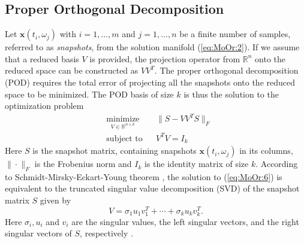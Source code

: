\documentclass[final]{siamart}
\begin{document}
\subsection{Proper Orthogonal Decomposition} \label{chap:MoOr.PrOr:1}
Let $\mathbf x (t_i,\omega_j)$ with $i=1,\dots,m$ and $j=1,\dots,n$ be a finite number of samples, referred to as \emph{snapshots}, from the solution manifold (\ref{eq:MoOr:2}). If we {{\color{black}} assume} that a reduced basis $V$ is provided, the projection operator from $\mathbb R^n$ onto the reduced space can be constructed as $VV^T$. The proper orthogonal decomposition (POD) requires the total error of projecting all the snapshots onto the reduced space to be {{\color{black}} minimized}. The POD basis of size $k$ is thus the solution to the optimization problem
\begin{equation} \label{eq:MoOr:6}
\begin{aligned}
& \underset{V\in \mathbb R^{n\times k}}{\text{minimize}}
& & \| S - VV^TS\|_F \\
& \text{subject to}
& & V^TV = I_k
\end{aligned}
\end{equation}
Here $S$ is the snapshot matrix, containing snapshots $\mathbf x(t_i,\omega_j)$ in its columns, $\|\cdot \|_F$ is the Frobenius norm and $I_k$ is the identity matrix of size $k$. According to {{\color{black}} Schmidt-Mirsky-Eckart-Young theorem \cite{Markovsky:2011:LRA:2103589}}, the solution to (\ref{eq:MoOr:6}) is equivalent to the truncated singular value decomposition (SVD) of the snapshot matrix $S$ given by
\begin{equation} \label{eq:MoOr:7}
	V = \sigma_1 u_1 v^T_1 + \cdots + \sigma_k u_k v^T_k.
\end{equation}
Here $\sigma_i, u_i$ and $v_i$ are the singular values, the left singular vectors, and the right singular vectors of $S$, respectively {{\color{black}} \cite{Markovsky:2011:LRA:2103589} }.
\end{document}
